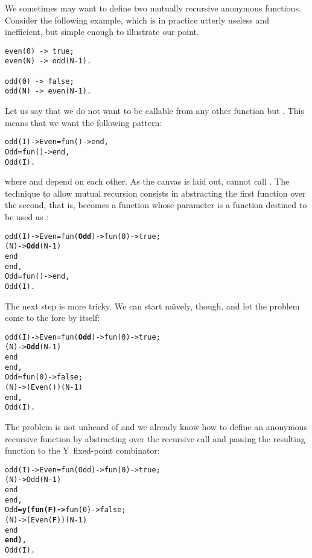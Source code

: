 We sometimes may want to define two mutually recursive anonymous
functions. Consider the following example, which is in practice
utterly useless and inefficient, but simple enough to illustrate our
point.
\begin{verbatim}
even(0) -> true;
even(N) -> odd(N-1).

odd(0) -> false;
odd(N) -> even(N-1).
\end{verbatim}
Let us say that we do not want  to be callable from
any other function but . This means that we want the
following pattern:
\begin{alltt}
odd(I) -> Even = fun() ->  end,
          Odd  = fun() ->  end,
          Odd(I).
\end{alltt}
where  and  depend on each other. As the
canvas is laid out,  cannot call . The
technique to allow mutual recursion consists in abstracting the first
function over the second, that is,  becomes a function
whose parameter is a function destined to be used as :
\begin{alltt}
odd(I) -> Even = fun(\textbf{Odd}) -> fun(0) -> true;
                                (N) -> \textbf{Odd}(N-1)
                             end
                 end,
          Odd  = fun() ->  end,
          Odd(I).
\end{alltt}
The next step is more tricky. We can start na\"{\i}vely, though, and
let the problem come to the fore by itself:
\begin{alltt}
odd(I) -> Even = fun(\textbf{Odd}) -> fun(0) -> true;
                                (N) -> \textbf{Odd}(N-1)
                             end
                 end,
          Odd  = fun(0) -> false;
                    (N) -> (Even())(N-1)
                 end,
          Odd(I).
\end{alltt}
The problem is not unheard of and we already know how to define an
anonymous recursive function by abstracting over the recursive call
and passing the resulting function to the Y~fixed\hyp{}point
combinator:
\begin{alltt}
odd(I) -> Even = fun(Odd) -> fun(0) -> true;
                                (N) -> Odd(N-1)
                             end
                 end,
          Odd  = \textbf{y(fun(F) ->} fun(0) -> false;
                                (N) -> (Even(\textbf{F}))(N-1)
                             end
                   \textbf{end)},
          Odd(I).
\end{alltt}
